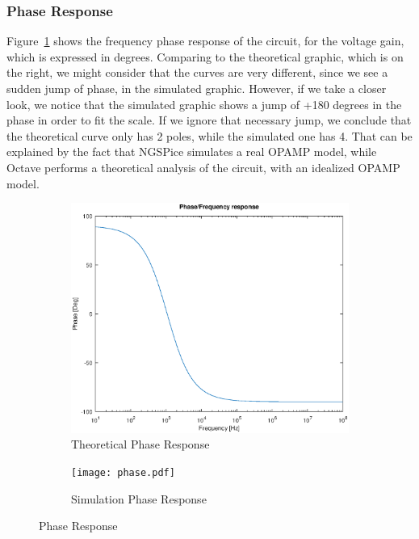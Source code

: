 \subsubsection{Phase Response}


Figure~\ref{fig:phase} shows the frequency phase response of the circuit, for the voltage gain, which is expressed in degrees. Comparing to the theoretical graphic, which is on the right, we might consider that the curves are very different, since we see a sudden jump of phase, in the simulated graphic. However, if we take a closer look, we notice that the simulated graphic shows a jump of +180 degrees in the phase in order to fit the scale. If we ignore that necessary jump, we conclude that the theoretical curve only has 2 poles, while the simulated one has 4. That can be explained by the fact that NGSPice simulates a real OPAMP model, while Octave performs a theoretical analysis of the circuit, with an idealized OPAMP model.


\begin{figure}[H]
\centering
\begin{subfigure}{.5\textwidth}
    \centering
    \vspace{2.8 cm}
    \includegraphics[scale=0.4]{phase_response.eps}
    \caption{Theoretical Phase Response}
\end{subfigure}%
\begin{subfigure}{.5\textwidth}
    \centering
    \texttt{[image: phase.pdf]}
    \caption{Simulation Phase Response}
\end{subfigure}
\caption{Phase Response}
\label{fig:phase}
\end{figure}



